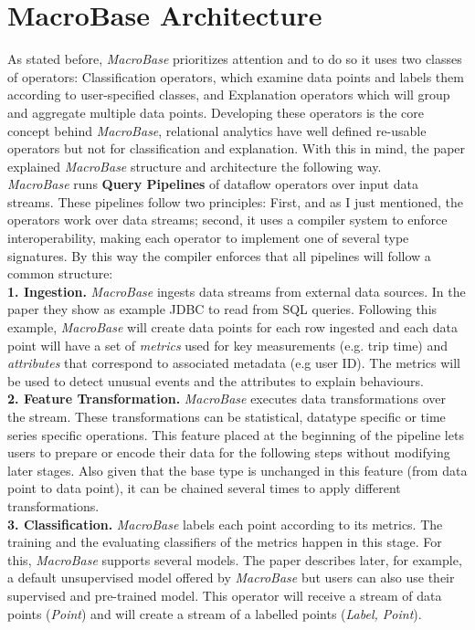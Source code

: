 \documentclass[11pt, titlepage]{article}
\begin{document}
	\section{MacroBase Architecture}
	\begin{flushleft}
		As stated before, \textit{MacroBase} prioritizes attention and to do so it uses two classes of operators: Classification operators, which examine data points and labels them according to user-specified classes, and Explanation operators which will group and aggregate multiple data points. Developing these operators is the core concept behind \textit{MacroBase}, relational analytics have well defined re-usable operators but not for classification and explanation. With this in mind, the paper explained \textit{MacroBase} structure and architecture the following way.
		\\\textit{MacroBase} runs \textbf{Query Pipelines} of dataflow operators over input data streams. These pipelines follow two principles: First, and as I just mentioned, the operators work over data streams; second, it uses a compiler system to enforce interoperability, making each operator to implement one of several type signatures. By this way the compiler enforces that all pipelines will follow a common structure:
		\\\textbf{1. Ingestion.} \textit{MacroBase} ingests data streams from external data sources. In the paper they show as example JDBC to read from SQL queries. Following this example, \textit{MacroBase} will create data points for each row ingested and each data point will have a set of \textit{metrics} used for key measurements (e.g. trip time) and \textit{attributes} that correspond to associated metadata (e.g user ID). The metrics will be used to detect unusual events and the attributes to explain behaviours.
		\\\textbf{2. Feature Transformation.} \textit{MacroBase} executes data transformations over the stream. These transformations can be statistical, datatype specific or time series specific operations. This feature placed at the beginning of the pipeline lets users to prepare or encode their data for the following steps without modifying later stages. Also given that the base type is unchanged in this feature (from data point to data point), it can be chained several times to apply different transformations.
		\\\textbf{3. Classification.} \textit{MacroBase} labels each point according to its metrics. The training and the evaluating classifiers of the metrics happen in this stage. For this, \textit{MacroBase} supports several models. The paper describes later, for example, a default unsupervised model offered by \textit{MacroBase}  but users can also use their supervised and pre-trained model. This operator will receive a stream of data points (\textit{Point}) and will create a stream of a labelled points (\textit{Label, Point}).

\end{flushleft}
\end{document}
